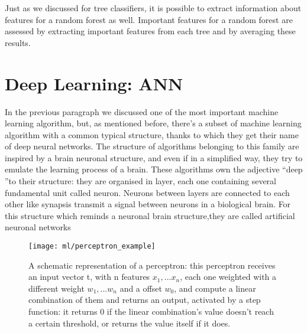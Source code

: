 \documentclass[11pt]{report}
\begin{document}

Just as we discussed for tree classifiers, it is possible to extract information about features for a random forest as well.
Important features for a random forest are assessed by extracting important features from each tree and by averaging these results.



\section{Deep Learning: ANN}

In the previous paragraph we discussed one of the most important machine learning algorithm, but, as mentioned before, there's a subset of machine learning algorithm with a common typical structure, thanks to which they get their name of deep neural networks.
The structure of algorithms belonging to this family are inspired by a brain neuronal structure, and even if in a simplified way, they try to emulate the learning process of a brain.
These algorithms own the adjective \textquotedblleft deep \textquotedblright to their structure: they are organised in layer, each one containing several fundamental unit called neuron.
Neurons between layers are connected to each other like synapsis transmit a signal between neurons in a biological brain.
For this structure which reminds a neuronal brain structure,they are called artificial neuronal networks

\begin{wrapfigure}{r}{0.4\textwidth}
\centering
\texttt{[image: ml/perceptron\_example]}
\caption{A schematic representation of a perceptron: this perceptron receives an input vector t, with n features $x_1, ... x_n$, each one weighted with a different weight $w_1, ... w_n$ and a offset $w_0$, and compute a linear combination of them and returns an output, activated by a step function: it returns 0 if the linear combination's value doesn't reach a certain threshold, or returns the value itself if it does.}
\label{fig:perceptron}
\end{wrapfigure}
\end{document}
